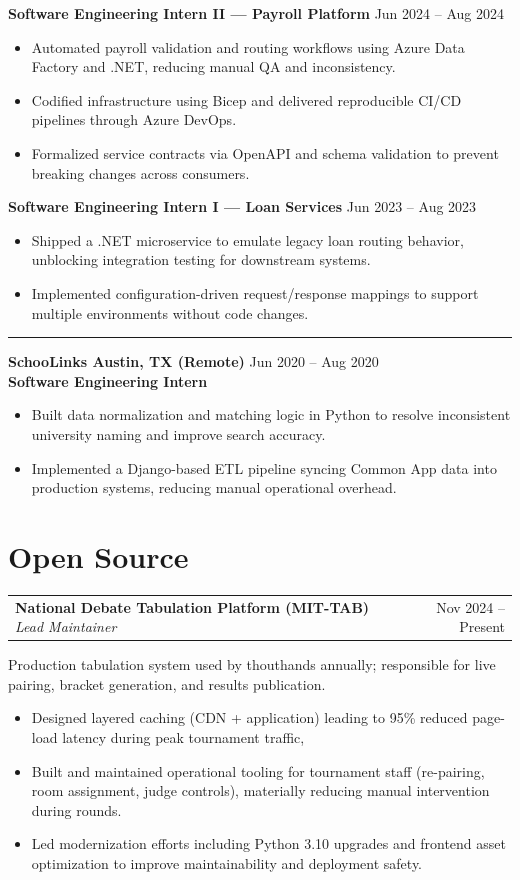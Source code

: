 \documentclass[11pt]{article}
\makeatletter
\newcommand{\EmployerSize}{11}
\newcommand{\EmployerLead}{13}
\newcommand{\EmployerWeight}{\bfseries}
\newcommand{\EmployerPreSkip}{1pt}
\newcommand{\EmployerPostSkip}{-2pt}
\newcommand{\RoleTitleSize}{11}
\newcommand{\RoleTitleLead}{13}
\newcommand{\RoleTitleWeight}{\bfseries}
\newcommand{\RoleDateSize}{10}
\newcommand{\RoleDateLead}{12}
\newcommand{\RolePreSkip}{2pt}
\newcommand{\RolePostSkip}{-8pt}
\newcommand{\BulletSize}{10}
\newcommand{\BulletLead}{12}
\newcommand{\BlurbSize}{10}
\newcommand{\BlurbLead}{12}
\newcommand{\BlurbPre}{0pt}
\newcommand{\BlurbPost}{-8pt}
\newcommand{\SepLength}{0.1\textwidth}
\newcommand{\SepThickness}{0.5pt}
\newcommand{\SepRaise}{1ex}
\newenvironment{twocol}[2]{%
  \noindent\begin{tabular*}{\textwidth}{@{\extracolsep{\fill}} l r}
  #1 & #2\\
  \end{tabular*}\ignorespaces
}{\par}
\newcommand{\EmployerHeader}[2]{%
  \vspace*{\EmployerPreSkip}%
  \noindent
  {\fontsize{\EmployerSize}{\EmployerLead}\selectfont \EmployerWeight #1}%
  \hfill
  {\fontsize{\EmployerSize}{\EmployerLead}\selectfont #2}%
  \\[\EmployerPostSkip]%
}
\newcommand{\RoleHeader}[2]{%
  \vspace*{\RolePreSkip}%
  \noindent
  {\fontsize{\RoleTitleSize}{\RoleTitleLead}\selectfont \RoleTitleWeight #1}%
  \hfill
  {\fontsize{\RoleDateSize}{\RoleDateLead}\selectfont #2}%
  \\[\RolePostSkip]%
}
\newenvironment{ResumeItemize}{%
  \begin{itemize}\fontsize{\BulletSize}{\BulletLead}\selectfont
}{%
  \end{itemize}
}
\newcommand{\ProjectBlurb}[1]{%
  \vspace*{\BlurbPre}%
  {\fontsize{\BlurbSize}{\BlurbLead}\selectfont #1}%
  \\[\BlurbPost]%
}
\newcommand*\sepline{%
  \par\vspace{4pt}%
  \noindent\rule[\SepRaise]{\SepLength}{\SepThickness}%
  \par\vspace{-6pt}%
}
\makeatother
\begin{document}
\RoleHeader{Software Engineering Intern II — Payroll Platform}{Jun 2024 -- Aug 2024}
\begin{ResumeItemize}
  \item Automated payroll validation and routing workflows using Azure Data Factory and .NET, reducing manual QA and inconsistency.
  \item Codified infrastructure using Bicep and delivered reproducible CI/CD pipelines through Azure DevOps.
  \item Formalized service contracts via OpenAPI and schema validation to prevent breaking changes across consumers.
\end{ResumeItemize}

\RoleHeader{Software Engineering Intern I — Loan Services}{Jun 2023 -- Aug 2023}
\begin{ResumeItemize}
  \item Shipped a .NET microservice to emulate legacy loan routing behavior, unblocking integration testing for downstream systems.
  \item Implemented configuration-driven request/response mappings to support multiple environments without code changes.
\end{ResumeItemize}
\sepline
\EmployerHeader{SchooLinks \quad Austin, TX (Remote)}{Jun 2020 -- Aug 2020}
\RoleHeader{Software Engineering Intern}{}
\begin{ResumeItemize}
  \item Built data normalization and matching logic in Python to resolve inconsistent university naming and improve search accuracy.
  \item Implemented a Django-based ETL pipeline syncing Common App data into production systems, reducing manual operational overhead.
\end{ResumeItemize}


\section{Open Source}

\begin{twocol}{\textbf{National Debate Tabulation Platform (MIT-TAB)} \;\textit{Lead Maintainer}}{Nov 2024 -- Present}\end{twocol}
\ProjectBlurb{Production tabulation system used by thouthands annually; responsible for live pairing, bracket generation, and results publication.}
\begin{ResumeItemize}
  \item Designed layered caching (CDN + application) leading to 95\% reduced page-load latency during peak tournament traffic, 
  \item Built and maintained operational tooling for tournament staff (re-pairing, room assignment, judge controls), materially reducing manual intervention during rounds.
  \item Led modernization efforts including Python 3.10 upgrades and frontend asset optimization to improve maintainability and deployment safety.
\end{ResumeItemize}
\end{document}
